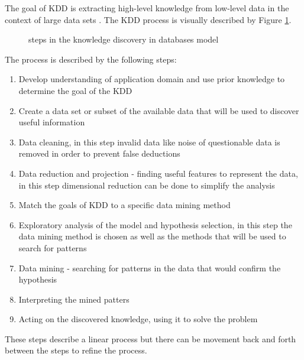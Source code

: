 The goal of KDD is extracting high-level knowledge from low-level data in the context of large data sets \cite{fayyad1996data}. The KDD process is visually described by Figure \ref{fig:6}.
\begin{figure}[!ht]
	\centering{}
	\caption{\cite{fayyad1996data} steps in the knowledge discovery in databases model}\label{fig:6}
\end{figure}
The process is described by the following steps:
\begin{enumerate}
	\item Develop understanding of application domain and use prior knowledge to determine the goal of the KDD
	\item Create a data set or subset of the available data that will be used to discover useful information
	\item Data cleaning, in this step invalid data like noise of questionable data is removed in order to prevent false deductions
	\item Data reduction and projection - finding useful features to represent the data, in this step dimensional reduction can be done to simplify the analysis
	\item Match the goals of KDD to a specific data mining method
	\item Exploratory analysis of the model and hypothesis selection, in this step the data mining method is chosen as  well as the methods that will be used to search for patterns
	\item Data mining - searching for patterns in the data that would confirm the hypothesis
	\item Interpreting the mined patters
	\item Acting on the discovered knowledge, using it to solve the problem
\end{enumerate}
These steps describe a linear process but there can be movement back and forth between the steps to refine the process.


